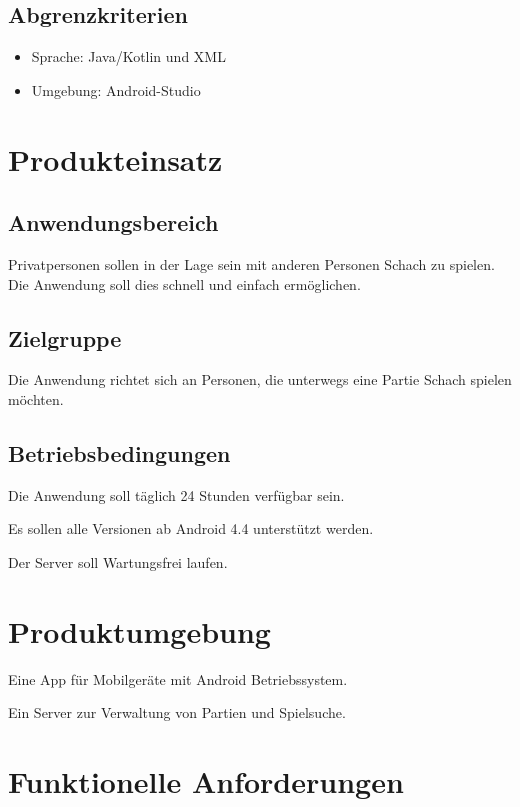 \documentclass[parskip=full]{scrartcl}
\begin{document}
\subsection{Abgrenzkriterien}
\begin{itemize}[nosep]
\item Sprache: Java/Kotlin und XML
\item Umgebung: Android-Studio
\end{itemize}
\section{Produkteinsatz}
	\subsection{Anwendungsbereich}
		
			Privatpersonen sollen in der Lage sein mit anderen Personen Schach zu spielen. Die Anwendung soll dies schnell und einfach ermöglichen.	
		
	\subsection{Zielgruppe}
		
			Die Anwendung richtet sich an Personen, die unterwegs eine Partie Schach spielen möchten.
		
	\subsection{Betriebsbedingungen}
		\begin{description}
			\item Die Anwendung soll täglich 24 Stunden verfügbar sein.
			\item Es sollen alle Versionen ab Android 4.4 unterstützt werden.
			\item Der Server soll Wartungsfrei laufen.	
		\end{description}
\section{Produktumgebung}
	\begin{description}
		\item Eine App für Mobilgeräte mit Android Betriebssystem.
		\item Ein Server zur Verwaltung von Partien und Spielsuche.		
	\end{description}
	\section{Funktionelle Anforderungen}
\end{document}
